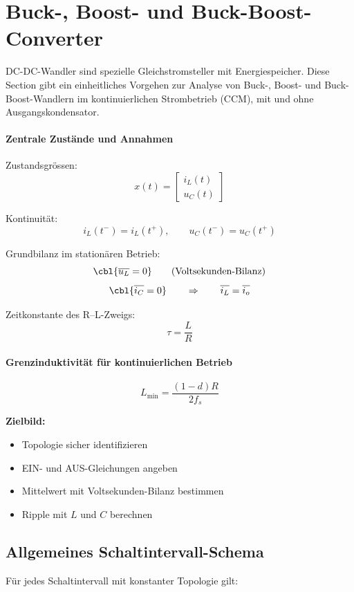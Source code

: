 \section{Buck-, Boost- und Buck-Boost-Converter}

DC-DC-Wandler sind spezielle Gleichstromsteller mit Energiespeicher.
Diese Section gibt ein einheitliches Vorgehen zur Analyse von Buck-, Boost- und Buck-Boost-Wandlern
im kontinuierlichen Strombetrieb (CCM), mit und ohne Ausgangskondensator.

\smallskip
\paragraph{Zentrale Zustände und Annahmen}

Zustandsgrössen:
\[
x(t) = \begin{bmatrix} i_L(t) \\ u_C(t) \end{bmatrix}
\]

Kontinuität:
\[
i_L(t^-) = i_L(t^+), 
\qquad 
u_C(t^-) = u_C(t^+)
\]

Grundbilanz im stationären Betrieb:
\[
\cbl{\overline{u_L} = 0}
\qquad\text{(Voltsekunden-Bilanz)}
\]
\[
\cbl{\overline{i_C} = 0}
\qquad\Rightarrow\qquad
\overline{i_L} = \overline{i_o}
\]

Zeitkonstante des R--L-Zweigs:
\[
\tau = \frac{L}{R}
\]

\smallskip
\paragraph{Grenzinduktivität für kontinuierlichen Betrieb}
\[
L_{\min} = \frac{(1-d)R}{2 f_s}
\]

\textbf{Zielbild:}
\begin{itemize}
    \item Topologie sicher identifizieren
    \item EIN- und AUS-Gleichungen angeben
    \item Mittelwert mit Voltsekunden-Bilanz bestimmen
    \item Ripple mit $L$ und $C$ berechnen
\end{itemize}

\subsection{Allgemeines Schaltintervall-Schema}

Für jedes Schaltintervall mit konstanter Topologie gilt:

